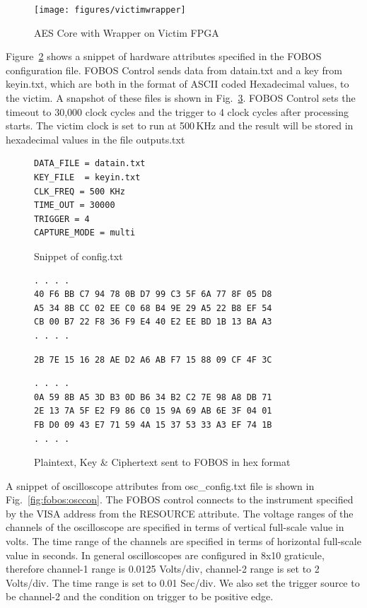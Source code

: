 \documentclass{llncs}
\numberwithin{algorithm}{chapter}
\begin{document}
\begin{figure}[ht]
\begin{center}
\texttt{[image: figures/victimwrapper]}
\caption{\label{fig:fobos-vicaes128}AES Core with Wrapper on Victim FPGA}
\end{center} 
\vspace{-3ex}
\end{figure}

Figure~\ref{fig:fobos-hardattb} shows a snippet of hardware attributes
specified in the FOBOS configuration file. FOBOS Control sends data from datain.txt 
and a key from keyin.txt, which are both in
the format of ASCII coded Hexadecimal values, to the victim. A snapshot of these files
is shown in Fig.~\ref{fig:fobos-iof}. FOBOS Control sets the timeout
to 30,000 clock cycles and the trigger to 4 clock cycles after processing starts.
The victim clock is set to run at 500\,KHz and the result will be 
stored in hexadecimal values in the file outputs.txt

\begin{figure}[ht]
\begin{Verbatim}[frame=single]
DATA_FILE = datain.txt
KEY_FILE  = keyin.txt
CLK_FREQ = 500 KHz 
TIME_OUT = 30000
TRIGGER = 4
CAPTURE_MODE = multi
\end{Verbatim}
\caption{\label{fig:fobos-hardattb}Snippet of config.txt}
\end{figure}


\begin{figure}[h]
\begin{Verbatim}[frame=single]
. . . .
40 F6 BB C7 94 78 0B D7 99 C3 5F 6A 77 8F 05 D8 
A5 34 8B CC 02 EE C0 68 B4 9E 29 A5 22 B8 EF 54 
CB 00 B7 22 F8 36 F9 E4 40 E2 EE BD 1B 13 BA A3
. . . .
\end{Verbatim}
\begin{Verbatim}[frame=single]
2B 7E 15 16 28 AE D2 A6 AB F7 15 88 09 CF 4F 3C
\end{Verbatim}
\begin{Verbatim}[frame=single]
. . . .
0A 59 8B A5 3D B3 0D B6 34 B2 C2 7E 98 A8 DB 71 
2E 13 7A 5F E2 F9 86 C0 15 9A 69 AB 6E 3F 04 01 
FB D0 09 43 E7 71 59 4A 15 37 53 33 A3 EF 74 1B 
. . . .
\end{Verbatim}
\caption{\label{fig:fobos-iof}Plaintext, Key \& Ciphertext sent to FOBOS in hex format}
\end{figure}

A snippet of oscilloscope attributes from osc\_config.txt file is shown in Fig.~\ref{fig:fobos:osccon}.
The FOBOS control connects to the instrument specified by the VISA address from the RESOURCE attribute.
The voltage ranges of the channels of the oscilloscope are specified in terms of vertical full-scale 
value in volts. The time range of the channels are specified in terms of horizontal full-scale
value in seconds. In general oscilloscopes are configured in 8x10 graticule, therefore channel-1 range 
is 0.0125 Volts/div, channel-2 range is set to 2 Volts/div. The time range is set to 0.01 Sec/div. We also set
the trigger source to be channel-2 and the condition on trigger to be positive edge.
\end{document}
